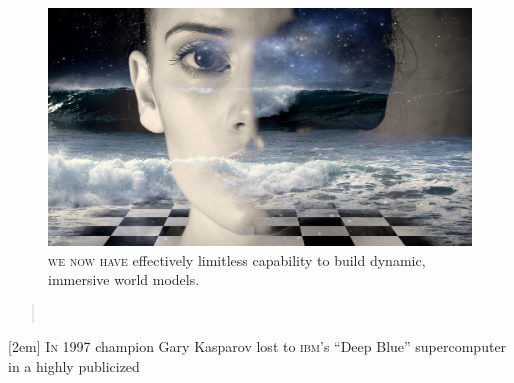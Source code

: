 \begin{figure}[h]                                                           
 \includegraphics[width=\linewidth]{./media/images/chess.jpg}%
  \scriptsize{\textsc{\\we now have} effectively limitless capability to build
    dynamic, immersive world models.}
  \label{fig:editorial}%
\end{figure}                                                                
\begin{quotation} 
\noindent{}\\[.5mm]
   \hfill{}
\end{quotation} 
\newpage
{}[2em]
\lettrine[lines=3]{\color{BrickRed}I}{\enspace n} 1997 champion Gary Kasparov
lost to \textsc{ibm}'s ``Deep Blue'' supercomputer in a highly publicized
